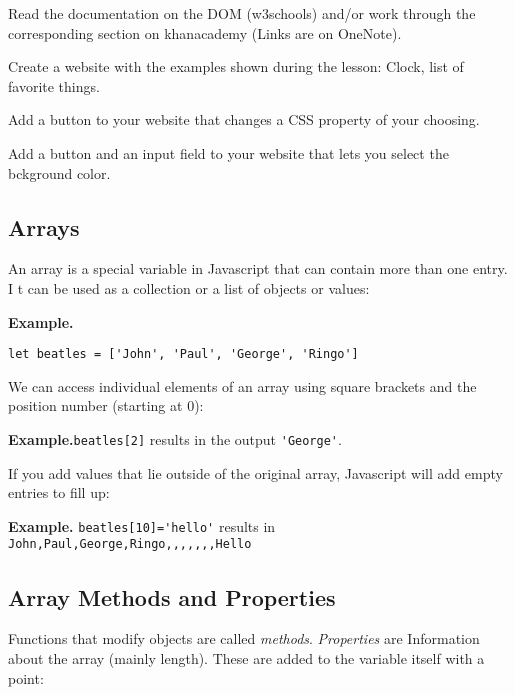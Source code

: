 \documentclass[11pt,a4paper]{report}
\begin{document}
\begin{ex}
Read the documentation on the DOM (w3schools) and/or work through the corresponding section on khanacademy (Links are on OneNote).
\end{ex}

\begin{ex}
Create a website with the examples shown during the lesson: Clock, list of favorite things.
\end{ex}

\begin{ex}
Add a button to your website that changes a CSS property of your choosing.
\end{ex}

\begin{ex}
Add a button and an input field to your website that lets you select the bckground color.
\end{ex}


\newpage

\subsection{Arrays}

An array is a special variable in Javascript that can contain more than one entry. I t can be used as a collection or a list of objects or values:

{\bf Example.}
\begin{verbatim}
let beatles = ['John', 'Paul', 'George', 'Ringo']
\end{verbatim}

We can access individual elements of an array using square brackets and the position number (starting at $0$): 

{\bf Example.}\verb|beatles[2]| results in the output \verb|'George'|.

If you add values that lie outside of the original array,  Javascript will add empty entries to fill up:

{\bf Example.} \verb|beatles[10]='hello'| results in 
\verb|John,Paul,George,Ringo,,,,,,,Hello|

\subsection{Array Methods and Properties}

Functions that modify objects are called \emph{methods}.  \emph{Properties} are Information about the array (mainly length). These are added to the variable itself with a point:
\end{document}
